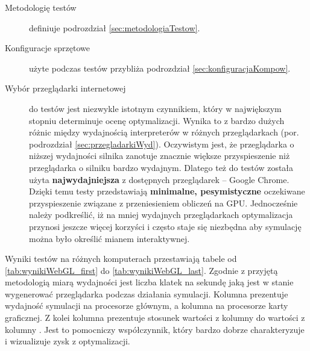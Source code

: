 \begin{description}

\item[Metodologię testów] definiuje podrozdział \ref{sec:metodologiaTestow}.

\item[Konfiguracje sprzętowe] użyte podczas testów przybliża podrozdział
\ref{sec:konfiguracjaKompow}.

\item[Wybór przeglądarki internetowej] do testów jest niezwykle istotnym
czynnikiem, który w największym stopniu determinuje ocenę optymalizacji. Wynika
to z bardzo dużych różnic między wydajnością interpreterów  w
różnych przeglądarkach (por. podrozdział \ref{sec:przegladarkiWyd}). Oczywistym
jest, że przeglądarka o niższej wydajności silnika  zanotuje
znacznie większe przyspieszenie niż przeglądarka o silniku bardzo wydajnym.
Dlatego też do testów została użyta \textbf{najwydajniejsza} z dostępnych
przeglądarek -- Google Chrome. Dzięki temu testy przedstawiają
\textbf{minimalne, pesymistyczne} oczekiwane przyspieszenie związane z
przeniesieniem obliczeń  na GPU. Jednocześnie należy podkreślić, iż na mniej
wydajnych przeglądarkach optymalizacja przynosi jeszcze więcej korzyści i
często staje się niezbędna aby symulację można było określić mianem
interaktywnej.

\end{description}

Wyniki testów na różnych komputerach przestawiają tabele od
\ref{tab:wynikiWebGL_first} do \ref{tab:wynikiWebGL_last}. Zgodnie z przyjętą
metodologią miarą wydajności jest liczba klatek na sekundę jaką jest w stanie
wygenerować przeglądarka podczas działania symulacji. Kolumna 
prezentuje wydajność symulacji na procesorze głównym, a kolumna  na
procesorze karty graficznej. Z kolei kolumna  prezentuje stosunek
wartości z kolumny  do wartości z kolumny . Jest to pomocniczy
współczynnik, który bardzo dobrze charakteryzuje i wizualizuje zysk z
optymalizacji.


